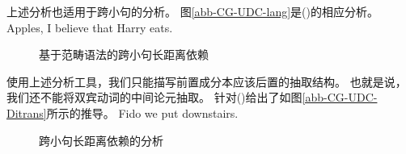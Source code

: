 \noindent
上述分析也适用于跨小句的分析。
图\vref{abb-CG-UDC-lang}是()的相应分析。
\ea
Apples, I believe that Harry eats.
\z
\begin{figure}
\centerline{%
}
\caption{\label{abb-CG-UDC-lang}基于范畴语法的跨小句长距离依赖}
\end{figure}%
%
使用上述分析工具，我们只能描写前置成分本应该后置的抽取结构。
也就是说，我们还不能将双宾动词的中间论元抽取\citep[]{Steedman85a-u}。
\citet[]{Pollard88a}针对()给出了如图\vref{abb-CG-UDC-Ditrans}所示的推导。
\ea
Fido we put downstairs.
\z
\begin{figure}
\centerline{%
}
\caption{\label{abb-CG-UDC-Ditrans}跨小句长距离依赖的分析}
\end{figure}%
